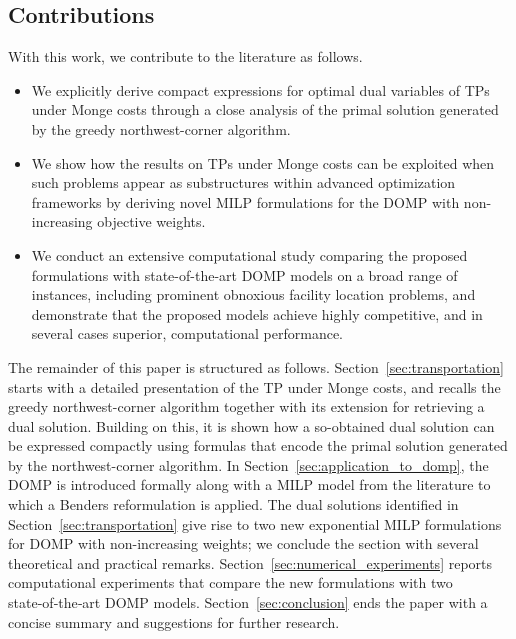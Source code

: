 \documentclass[letterpaper]{article}
\begin{document}
\subsection{Contributions}
With this work, we contribute to the literature as follows.
\begin{itemize}
    \item We explicitly derive compact expressions for optimal dual variables of TPs under Monge costs through a close analysis of the primal solution generated by the greedy northwest-corner algorithm.
    \item We show how the results on TPs under Monge costs can be exploited when such problems appear as substructures within advanced optimization frameworks by deriving novel MILP formulations for the DOMP with non-increasing objective weights.
    \item We conduct an extensive computational study comparing the proposed formulations with state-of-the-art DOMP models on a broad range of instances, including prominent obnoxious facility location problems, and demonstrate that the proposed models achieve highly competitive, and in several cases superior, computational performance.
\end{itemize}

The remainder of this paper is structured as follows. Section~\ref{sec:transportation} starts with a detailed presentation of the TP under Monge costs, and recalls the greedy northwest-corner algorithm together with its extension for retrieving a dual solution. Building on this, it is shown how a so-obtained dual solution can be expressed compactly using formulas that encode the primal solution generated by the northwest-corner algorithm. In Section~\ref{sec:application_to_domp}, the DOMP is introduced formally along with a MILP model from the literature to which a Benders reformulation is applied. The dual solutions identified in Section~\ref{sec:transportation} give rise to two new exponential MILP formulations for DOMP with non-increasing weights; we conclude the section with several theoretical and practical remarks. Section~\ref{sec:numerical_experiments} reports computational experiments that compare the new formulations with two state‑of‑the‑art DOMP models. Section~\ref{sec:conclusion} ends the paper with a concise summary and suggestions for further research.
\end{document}
